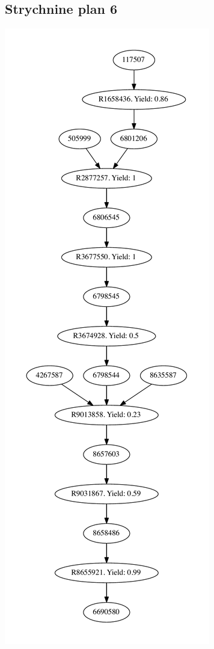 \documentclass[a4paper,10pt,titlepage]{paper}
\begin{document}
\subsection{Strychnine plan 6}
\centering
\includegraphics[scale=0.4]{Synteseplaner/Strychnine/plan6.pdf}
\label{Appendix::Strychnine6}
\end{document}
